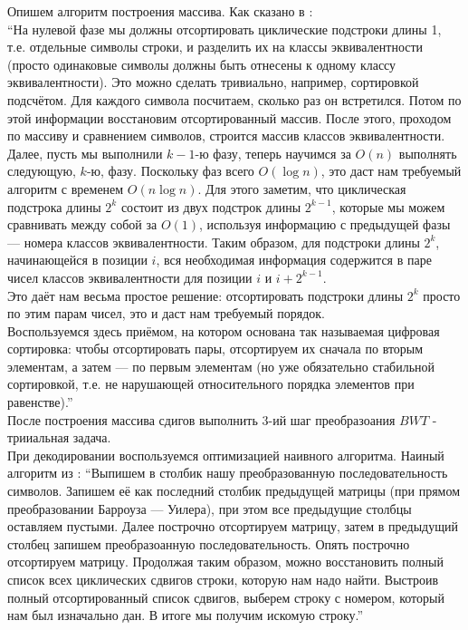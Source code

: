 Опишем алгоритм построения массива. Как сказано в \cite{emax}: \\
\enquote{На нулевой фазе мы должны отсортировать циклические подстроки длины 1, т.е. отдельные символы строки, и разделить их на классы эквивалентности (просто одинаковые символы должны быть отнесены к одному классу эквивалентности). Это можно сделать тривиально, например, сортировкой подсчётом. Для каждого символа посчитаем, сколько раз он встретился. Потом по этой информации восстановим отсортированный массив. После этого, проходом по массиву и сравнением символов, строится массив классов эквивалентности. \\
Далее, пусть мы выполнили $k-1$-ю фазу, теперь научимся за $O(n)$ выполнять следующую, $k$-ю, фазу. Поскольку фаз всего $O(\log{n})$, это даст нам требуемый алгоритм с временем $O(n\log{n})$.
Для этого заметим, что циклическая подстрока длины $2^k$ состоит из двух подстрок длины $2^{k-1}$, которые мы можем сравнивать между собой за $O(1)$, используя информацию с предыдущей фазы — номера классов эквивалентности. Таким образом, для подстроки длины $2^k$, начинающейся в позиции $i$, вся необходимая информация содержится в паре чисел классов эквивалентности для позиции $i$ и $i + 2^{k-1}$.\\
Это даёт нам весьма простое решение: отсортировать подстроки длины $2^k$ просто по этим парам чисел, это и даст нам требуемый порядок. \\
Воспользуемся здесь приёмом, на котором основана так называемая цифровая сортировка: чтобы отсортировать пары, отсортируем их сначала по вторым элементам, а затем — по первым элементам (но уже обязательно стабильной сортировкой, т.е. не нарушающей относительного порядка элементов при равенстве).} \\

После построения массива сдигов выполнить 3-ий шаг преобразоания $BWT$ - трииальная задача.\\

При декодировании воспользуемся оптимизацией наивного алгоритма. Наиный алгоритм из \cite{bwt}: \enquote{Выпишем в столбик нашу преобразованную последовательность символов. Запишем её как последний столбик предыдущей матрицы (при прямом преобразовании Барроуза — Уилера), при этом все предыдущие столбцы оставляем пустыми. Далее построчно отсортируем матрицу, затем в предыдущий столбец запишем преобразоанную последовательность. Опять построчно отсортируем матрицу. Продолжая таким образом, можно восстановить полный список всех циклических сдвигов строки, которую нам надо найти. Выстроив полный отсортированный список сдвигов, выберем строку с номером, который нам был изначально дан. В итоге мы получим искомую строку.} \\ 

